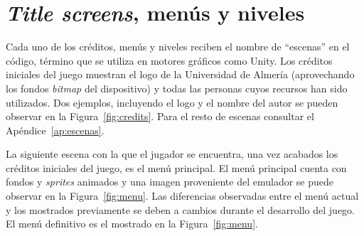\section{\textit{Title screens}, menús y niveles}
Cada uno de los créditos, menús y niveles reciben el nombre de ``escenas'' en el código, término que se utiliza en motores gráficos como Unity. Los créditos iniciales del juego muestran el logo de la Universidad de Almería (aprovechando los fondos \textit{bitmap} del dispositivo) y todas las personas cuyos recursos han sido utilizados. Dos ejemplos, incluyendo el logo y el nombre del autor se pueden observar en la Figura~\ref{fig:credits}. Para el resto de escenas consultar el Apéndice~\ref{ap:escenas}.

La siguiente escena con la que el jugador se encuentra, una vez acabados los créditos iniciales del juego, es el menú principal. El menú principal cuenta con fondos y \textit{sprites} animados y una imagen proveniente del emulador se puede observar en la Figura~\ref{fig:menu}. Las diferencias observadas entre el menú actual y los mostrados previamente se deben a cambios durante el desarrollo del juego. El menú definitivo es el mostrado en la Figura~\ref{fig:menu}.

